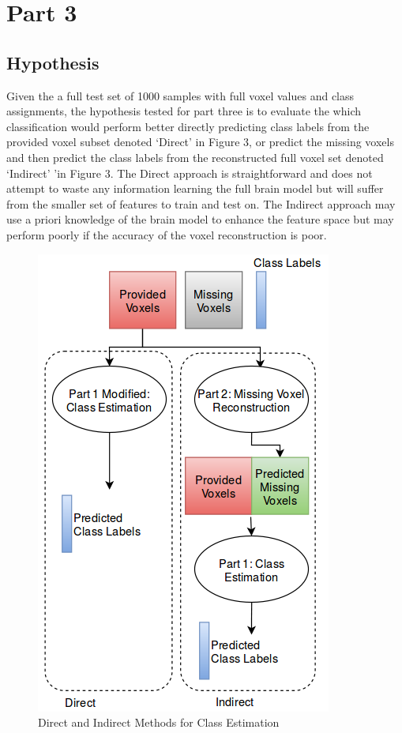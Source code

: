 \documentclass{article} %
\begin{document}
\section{Part 3}

\subsection{Hypothesis}
Given the a full test set of 1000 samples with full voxel values and class assignments, the hypothesis tested for part three is to evaluate the which classification would perform better directly predicting class labels from the provided voxel subset denoted ‘Direct’ in Figure 3,  or predict the missing voxels and then predict the class labels from the reconstructed full voxel set denoted ‘Indirect’ ’in Figure 3.  The Direct approach is straightforward and does not attempt to waste any information learning the full brain model but will suffer from the smaller set of features to train and test on. The Indirect approach may use a priori knowledge of the brain model to enhance the feature space but may perform poorly if the accuracy of the voxel reconstruction is poor.

\begin{figure}
	\begin{center}
		\includegraphics[scale=.35]{media/take2.png}
	\end{center}
	\caption{Direct and Indirect Methods for Class Estimation}
	\vspace{-20pt}
\end{figure}
\end{document}
